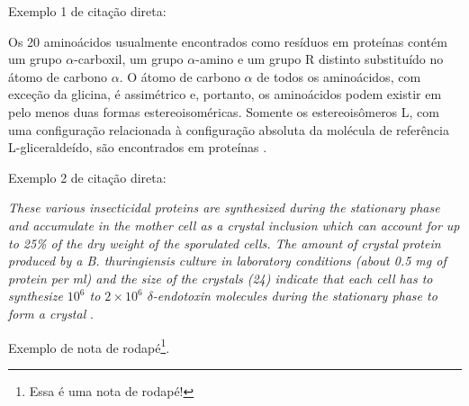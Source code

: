 Exemplo 1 de citação direta:

\begin{citacao}
	Os 20 aminoácidos usualmente encontrados como resíduos em proteínas contém um grupo $\alpha$-carboxil, um grupo $\alpha$-amino e um grupo R distinto substituído no átomo de carbono $\alpha$. O átomo de carbono $\alpha$ de todos os aminoácidos, com exceção da glicina, é assimétrico e, portanto, os aminoácidos podem existir em pelo menos duas formas estereoisoméricas. Somente os estereoisômeros L, com uma configuração relacionada à configuração absoluta da molécula de referência L-gliceraldeído, são encontrados em proteínas \cite[p. 81]{Nelson2014}.
\end{citacao}

Exemplo 2 de citação direta:

\begin{citacao}
	\textit{These various insecticidal proteins are synthesized during the stationary phase and accumulate in the mother cell as a crystal inclusion which can account for up to 25\% of the dry weight of the sporulated cells. The amount of crystal protein produced by a B. thuringiensis culture in laboratory conditions (about 0.5 mg of protein per ml) and the size of the crystals (24) indicate that each cell has to synthesize $10^6$ to $2 \times 10^6$ $\delta$-endotoxin molecules during the stationary phase to form a crystal} \cite[p. 1]{Agaisse1995}.
\end{citacao}

Exemplo de nota de rodapé\footnote{Essa é uma nota de rodapé!}.
